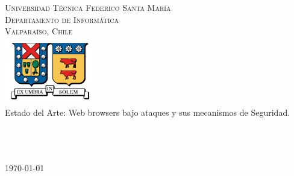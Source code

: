 \begin{titlepage}

\begin{center}

\textsc{\Large Universidad Técnica Federico Santa María}\\
\textsc{\large Departamento de Informática}\\
\textsc{\large Valparaíso, Chile}\\[1.5cm]

\includegraphics[width=0.3\textwidth]{figures/utfsm.jpg}\\[1cm]    

{ \huge Estado del Arte: Web browsers bajo ataques y sus mecanismos de Seguridad.}\\[2cm]

\\[2cm]
\\[3cm]
\\

\vfill

{\large \today}

\end{center}

\end{titlepage}
